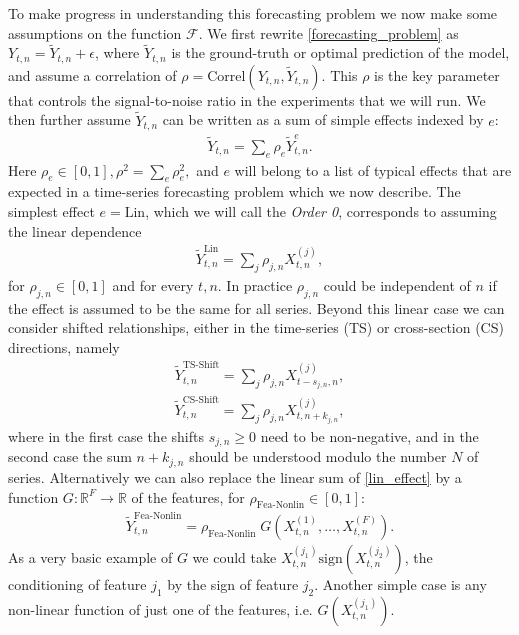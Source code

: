 \documentclass{article}
\begin{document}
To make progress in understanding this forecasting problem we now make some assumptions on the function $\mathcal{F}$. We first rewrite \eqref{forecasting_problem} as $Y_{t,n} = \widetilde Y_{t,n} + \epsilon$, where $\widetilde Y_{t,n}$ is the ground-truth or optimal prediction of the model, and assume  a correlation of $\rho = \text{Correl}(Y_{t,n}, \widetilde Y_{t,n})$. This $\rho$ is the key parameter that controls the signal-to-noise ratio in the experiments that we will run. We then further assume $\widetilde Y_{t,n}$ can be written as a sum of simple effects indexed by $e$:
\begin{align}\label{eq_sum_effects}
\widetilde Y_{t,n} = \sum_e \rho_e \widetilde Y_{t,n}^{e}.
\end{align}
Here $\rho_e \in [0,1], \rho^2 = \sum_e \rho_e^2,$ and $e$ will belong to a list of typical effects that are expected in a time-series forecasting problem which we now describe. The simplest effect $e = \text{Lin}$, which we will call the \textit{Order 0}, corresponds to assuming the linear dependence
\begin{align}\label{lin_effect}
 \widetilde Y_{t,n}^{\text{Lin}} = \sum_j \rho_{j,n} X_{t,n}^{(j)},
\end{align}
for $\rho_{j,n} \in [0,1]$ and for every $t,n$. In practice $\rho_{j, n}$ could be independent of $n$ if the effect is assumed to be the same for all series. Beyond this linear case we can consider shifted relationships, either in the time-series (TS) or cross-section (CS) directions, namely
\begin{align}\label{TS_shift}
\widetilde Y_{t,n}^{\text{TS-Shift}} = \sum_j \rho_{j,n} X_{t - s_{j,n},n}^{(j)},
\end{align}
\begin{align}\label{CS_shift}
\widetilde Y_{t,n}^{\text{CS-Shift}} = \sum_j \rho_{j,n} X_{t,n+k_{j,n}}^{(j)},
\end{align}
where in the first case the shifts $s_{j,n} \geq 0$ need to be non-negative, and in the second case the sum $n + k_{j,n}$ should be understood modulo the number $N$ of series. Alternatively we can also replace the linear sum of \eqref{lin_effect} by a function $G: \mathbb{R} ^F \rightarrow \mathbb{R}$ of the features, for $\rho_{\text{Fea-Nonlin}} \in [0,1]$:
\begin{align}\label{Non-lin}
\widetilde Y_{t,n}^{\text{Fea-Nonlin}} = \rho_{\text{Fea-Nonlin}} \; G(X_{t,n}^{(1)}, \dots, X_{t,n}^{(F)}).
\end{align}
As a very basic example of $G$ we could take $X_{t,n}^{(j_1)} \textrm{sign} (X_{t,n}^{(j_2)}) $, the conditioning of feature $j_1$ by the sign of feature $j_2$. Another simple case is any non-linear function of just one of the features, i.e. $G(X_{t,n}^{(j_1)})$.
\end{document}
